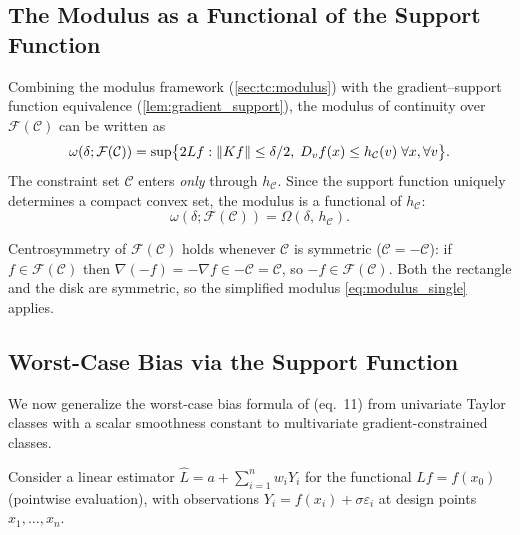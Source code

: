 \subsection{The Modulus as a Functional of the Support Function}\label{sec:tc:modulus_functional}

Combining the modulus framework (\cref{sec:tc:modulus}) with the gradient--support function equivalence (\cref{lem:gradient_support}), the modulus of continuity over $\mathcal{F}(\mathcal{C})$ can be written as
\begin{equation}\label{eq:modulus_hC}
	\omega(\delta; \mathcal{F}(\mathcal{C})) = \sup\bigl\{ 2Lf : \lVert Kf\rVert \leq \delta/2,\; D_v f(x) \leq h_{\mathcal{C}}(v) \;\forall x, \forall v \bigr\}.
\end{equation}
The constraint set $\mathcal{C}$ enters \emph{only} through $h_{\mathcal{C}}$.
Since the support function uniquely determines a compact convex set, the modulus is a functional of $h_{\mathcal{C}}$:
\begin{equation*}
	\omega(\delta; \mathcal{F}(\mathcal{C})) = \Omega(\delta,\, h_{\mathcal{C}}).
\end{equation*}

\begin{remark}
	Centrosymmetry of $\mathcal{F}(\mathcal{C})$ holds whenever $\mathcal{C}$ is symmetric ($\mathcal{C} = -\mathcal{C}$): if $f \in \mathcal{F}(\mathcal{C})$ then $\nabla(-f) = -\nabla f \in -\mathcal{C} = \mathcal{C}$, so $-f \in \mathcal{F}(\mathcal{C})$.
	Both the rectangle and the disk are symmetric, so the simplified modulus \eqref{eq:modulus_single} applies.
\end{remark}


\subsection{Worst-Case Bias via the Support Function}\label{sec:tc:wcb}

We now generalize the worst-case bias formula of \textcite{armstrong_optimal_2018} (eq.~11) from univariate Taylor classes with a scalar smoothness constant to multivariate gradient-constrained classes.

Consider a linear estimator $\hat{L} = a + \sum_{i=1}^n w_i Y_i$ for the functional $Lf = f(x_0)$ (pointwise evaluation), with observations $Y_i = f(x_i) + \sigma\varepsilon_i$ at design points $x_1, \ldots, x_n$.

